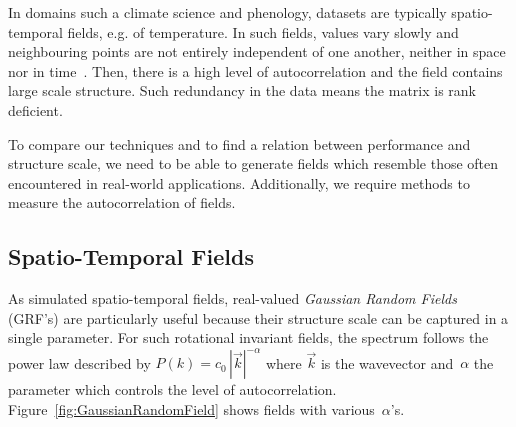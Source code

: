 \documentclass[ijgi,article,submit,moreauthors,pdftex,10pt,a4paper]{Definitions/mdpi}
\begin{document}

In domains such a climate science and phenology, datasets are typically spatio-temporal fields, e.g. of temperature. In such fields, values vary slowly and neighbouring points are not entirely independent of one another, neither in space nor in time~\cite{Eshel2011}. Then, there is a high level of autocorrelation and the field contains large scale structure. Such redundancy in the data means the matrix is rank deficient.

To compare our techniques and to find a relation between performance and structure scale, we need to be able to generate fields which resemble those often encountered in real-world applications. Additionally, we require methods to measure the autocorrelation of fields.

\subsection{Spatio-Temporal Fields}
\label{sec:Materials and Methods/Spatio-Temporal Fields}

As simulated spatio-temporal fields, real-valued \textit{Gaussian Random Fields} (GRF's) are particularly useful because their structure scale can be captured in a single parameter. For such rotational invariant fields, the spectrum follows the power law described by $P(k) = c_{0} \, |\vec{k}|^{-\alpha}$ where $\vec{k}$ is the wavevector and~$\alpha$ the parameter which controls the level of autocorrelation. Figure~\ref{fig:GaussianRandomField} shows fields with various~$\alpha$'s.
\end{document}
